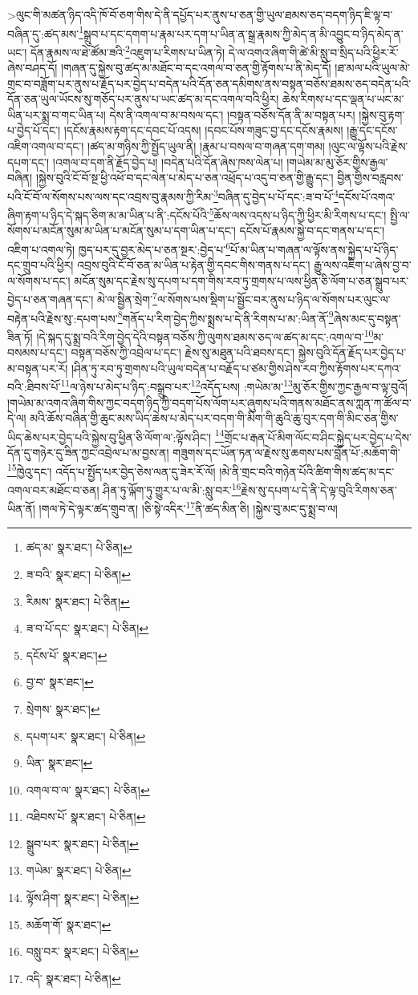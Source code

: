  >ལུང་གི་མཚན་ཉིད་འདི་ཁོ་བོ་ཅག་གིས་དེ་ནི་དཔྱོད་པར་ནུས་པ་ཅན་གྱི་ཡུལ་ཐམས་ཅད་བདག་ཉིད་ཇི་ལྟ་བ་བཞིན་དུ་:ཚད་མས་\footnote{ཚད་མ་  སྣར་ཐང་།  པེ་ཅིན། }སྒྲུབ་པ་དང་དགག་པ་རྣམ་པར་དག་པ་ཡིན་ན་སྒྲ་རྣམས་ཀྱི་མེད་ན་མི་འབྱུང་བ་ཉིད་མེད་ན་ཡང་། དོན་རྣམས་ལ་ཐེ་ཚོམ་ཟའི་\footnote{ཟ་བའི་  སྣར་ཐང་།  པེ་ཅིན། }འཇུག་པ་རིགས་པ་ཡིན་ཏེ། དེ་ལ་འགའ་ཞིག་གི་ཚེ་མི་སླུ་བ་སྲིད་པའི་ཕྱིར་རོ་ཞེས་བཤད་དོ། །གཞན་དུ་སྐྱེས་བུ་ཚད་མ་མཐོང་བ་དང་འགལ་བ་ཅན་གྱི་རྟོགས་པ་ནི་མེད་དོ། །ཐ་མལ་པའི་ཡུལ་མེ་གྲང་བ་བཟློག་པར་ནུས་པ་རྗོད་པར་བྱེད་པ་བདེན་པའི་དོན་ཅན་དམིགས་ནས་བསྟན་བཅོས་ཐམས་ཅད་བདེན་པའི་དོན་ཅན་ཡུལ་ཡོངས་སུ་གཅོད་པར་ནུས་པ་ཡང་ཚད་མ་དང་འགལ་བའི་ཕྱིར། ཆེས་རིགས་པ་དང་ལྡན་པ་ཡང་མ་ཡིན་པར་སྨྲ་བ་གང་ཡིན་པ། དེས་ནི་འགལ་བ་མ་བསལ་དང་། །བསྟན་བཅོས་དོན་ནི་མ་བསྟན་པར། །སྐྱེས་བུ་རྟག་པ་བྱེད་པོ་དང་། །དངོས་རྣམས་རྟག་དང་དབང་པོ་འདས། །དབང་པོས་གཟུང་བྱ་དང་དངོས་རྣམས། །རྒྱུ་དང་དངོས་འཇིག་འགལ་བ་དང་། །ཚད་མ་གཉིས་ཀྱི་སྤྱོད་ཡུལ་ནི། །རྣམ་པ་བསལ་བ་གཞན་དག་གམ། །ལུང་ལ་ལྟོས་པའི་རྗེས་དཔག་དང་། །འགལ་བ་དག་ནི་རྗོད་བྱེད་པ། །བདེན་པའི་དོན་ཞེས་ཁས་ལེན་པ། །གཡེམ་མ་མུ་ཅོར་གྱིས་རྒྱལ་བཞིན། །སྐྱེས་བུའི་ངོ་བོ་སྔ་ཕྱི་འཕོ་བ་དང་ལེན་པ་མེད་པ་ཅན་འཕྲོད་པ་འདུ་བ་ཅན་གྱི་རྒྱུ་དང་། བྱིན་གྱིས་བརླབས་པའི་ངོ་བོ་ལ་སོགས་པས་ལས་དང་འབྲས་བུ་རྣམས་ཀྱི་རིམ་\footnote{རིམས་  སྣར་ཐང་།  པེ་ཅིན། }བཞིན་དུ་བྱེད་པ་པོ་དང་:ཟ་བ་པོ་\footnote{ཟ་བ་པོ་དང་  སྣར་ཐང་།  པེ་ཅིན། }དངོས་པོ་འགའ་ཞིག་རྟག་པ་ཉིད་དེ་སྐད་ཅིག་མ་མ་ཡིན་པ་ནི་:དངོས་པོའི་\footnote{དངོས་པོ་  སྣར་ཐང་། }ཆོས་ལས་འདས་པ་ཉིད་ཀྱི་ཕྱིར་མི་རིགས་པ་དང་། སྤྱི་ལ་སོགས་པ་མངོན་སུམ་མ་ཡིན་པ་མངོན་སུམ་པ་དག་ཡིན་པ་དང་། དངོས་པོ་རྣམས་སྐྱེ་བ་དང་གནས་པ་དང་། འཇིག་པ་འགལ་ཏེ། ཁྱད་པར་དུ་བྱར་མེད་པ་ཅན་སྔར་:བྱེད་པ་\footnote{བྱ་བ་  སྣར་ཐང་། }པོ་མ་ཡིན་པ་གཞན་ལ་ལྟོས་ནས་སྐྱེད་པ་པོ་ཉིད་དང་གྲུབ་པའི་ཕྱིར། འབྲས་བུའི་ངོ་བོ་ཅན་མ་ཡིན་པ་རྟེན་གྱི་དབང་གིས་གནས་པ་དང་། རྒྱུ་ལས་འཇིག་པ་ཞེས་བྱ་བ་ལ་སོགས་པ་དང་། མངོན་སུམ་དང་རྗེས་སུ་དཔག་པ་དག་གིས་རབ་ཏུ་གྲགས་པ་ལས་ཕྱིན་ཅི་ལོག་པ་ཅན་སྒྲུབ་པར་བྱེད་པ་ཅན་གཞན་དང་། མེ་ལ་སྦྱིན་སྲེག་\footnote{སྲེགས་  སྣར་ཐང་། }ལ་སོགས་པས་སྡིག་པ་སྦྱོང་བར་ནུས་པ་ཉིད་ལ་སོགས་པར་ལུང་ལ་བརྟེན་པའི་རྗེས་སུ་:དཔག་པས་\footnote{དཔག་པར་  སྣར་ཐང་།  པེ་ཅིན། }གནོད་པ་རིག་བྱེད་ཀྱིས་སྨྲས་པ་དེ་ནི་རིགས་པ་མ་:ཡིན་ནོ་\footnote{ཡིན་  སྣར་ཐང་། }ཞེས་མང་དུ་བསྟན་ཟིན་ཏོ། །དེ་སྐད་དུ་སྨྲ་བའི་རིག་བྱེད་དེའི་བསྟན་བཅོས་ཀྱི་ལུགས་ཐམས་ཅད་ལ་ཚད་མ་དང་:འགལ་བ་\footnote{འགལ་བ་ལ་  སྣར་ཐང་།  པེ་ཅིན། }མ་བསམས་པ་དང་། བསྟན་བཅོས་ཀྱི་འབྲེལ་པ་དང་། རྗེས་སུ་མཐུན་པའི་ཐབས་དང་། སྐྱེས་བུའི་དོན་རྗོད་པར་བྱེད་པ་མ་བསྟན་པར་རོ། །ཤིན་ཏུ་རབ་ཏུ་གྲགས་པའི་ཡུལ་བདེན་པ་བརྗོད་པ་ཙམ་གྱིས་ཤེས་རབ་ཀྱིས་རྟོགས་པར་དཀའ་བའི་:ཐིབས་པོ་\footnote{འཐིབས་པོ་  སྣར་ཐང་།  པེ་ཅིན། }ལ་ཉེས་པ་མེད་པ་ཉིད་:བསྒྲུབ་པར་\footnote{སྒྲུབ་པར་  སྣར་ཐང་།  པེ་ཅིན། }འདོད་པས། :གཡེམ་མ་\footnote{གཡེམ་  སྣར་ཐང་།  པེ་ཅིན། }མུ་ཅོར་གྱིས་ཀྱང་རྒྱལ་བ་ལྟ་བུའོ། །གཡེམ་མ་འགའ་ཞིག་གིས་ཀྱང་བདག་ཉིད་ཀྱི་བདག་པོས་ལོག་པར་ཞུགས་པའི་གནས་མཐོང་ནས་ཀླན་ཀ་ཚོལ་བ་དེ་ལ། མའི་ཆོས་བཞིན་གྱི་ཆུང་མས་ཡིད་ཆེས་པ་མེད་པར་བདག་གི་མིག་གི་ཆུའི་ཆུ་བུར་དག་གི་མིང་ཅན་གྱིས་ཡིད་ཆེས་པར་བྱེད་པའི་སྐྱེས་བུ་ཕྱིན་ཅི་ལོག་ལ་:ལྟོས་ཤིང་། \footnote{ལྟོས་ཤིག་  སྣར་ཐང་།  པེ་ཅིན། }གྲོང་པ་རྒན་པོ་མིག་ལོང་བ་ཤིང་སྐྱེད་པར་བྱེད་པ་དེས་དོན་དུ་གཉེར་དུ་ཟིན་ཀྱང་འབྲེལ་པ་མ་བྱས་ན། གཟུགས་དང་ཡོན་ཏན་ལ་རྗེས་སུ་ཆགས་པས་བློན་པོ་:མཆོག་གི་\footnote{མཆོག་གོ་  སྣར་ཐང་། }ཁྱེའུ་དང་། འདོད་པ་སྤྱོད་པར་བྱེད་ཅེས་ལན་དུ་ཟེར་རོ་ལོ། །མེ་ནི་གྲང་བའི་གཉེན་པོའི་ཚིག་གིས་ཚད་མ་དང་འགལ་བར་མཐོང་བ་ཅན། ཤིན་ཏུ་ལྐོག་ཏུ་གྱུར་པ་ལ་མི་:སླུ་བར་\footnote{བསླུ་བར་  སྣར་ཐང་།  པེ་ཅིན། }རྗེས་སུ་དཔག་པ་དེ་ནི་དེ་ལྟ་བུའི་རིགས་ཅན་ཡིན་ནོ། །གལ་ཏེ་དེ་ལྟར་ཚད་གྲུབ་ན། །ཅི་སྟེ་འདིར་\footnote{འདི་  སྣར་ཐང་།  པེ་ཅིན། }ནི་ཚད་མིན་ཅི། །སྐྱེས་བུ་མང་དུ་སྨྲ་བ་ལ། 